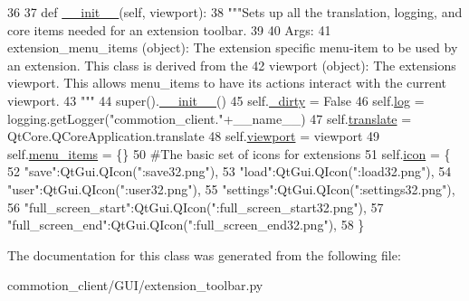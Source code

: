 \begin{DoxyCode}
36 
37     \textcolor{keyword}{def }\hyperlink{classcommotion__client_1_1GUI_1_1extension__toolbar_1_1ExtensionToolBar_a29e92f0e66f5f056be55e3a5ef7f2fd8}{\_\_init\_\_}(self, viewport):
38         \textcolor{stringliteral}{"""Sets up all the translation, logging, and core items needed for an extension toolbar.}
39 \textcolor{stringliteral}{        }
40 \textcolor{stringliteral}{        Args:}
41 \textcolor{stringliteral}{          extension\_menu\_items (object): The extension specific menu-item to be used by an extension. This
       class is derived from the  }
42 \textcolor{stringliteral}{          viewport (object): The extensions viewport. This allows menu\_items to have its actions interact
       with the current viewport.        }
43 \textcolor{stringliteral}{        """}
44         super().\hyperlink{classcommotion__client_1_1GUI_1_1extension__toolbar_1_1ExtensionToolBar_a29e92f0e66f5f056be55e3a5ef7f2fd8}{\_\_init\_\_}()
45         self.\hyperlink{classcommotion__client_1_1GUI_1_1extension__toolbar_1_1ExtensionToolBar_a84233fa2bbebfb96f4c6c490487b4f87}{\_dirty} = \textcolor{keyword}{False}
46         self.\hyperlink{classcommotion__client_1_1GUI_1_1extension__toolbar_1_1ExtensionToolBar_a6319ad6aa6c0480e17413b5c8a018d5f}{log} = logging.getLogger(\textcolor{stringliteral}{"commotion\_client."}+\_\_name\_\_)
47         self.\hyperlink{classcommotion__client_1_1GUI_1_1extension__toolbar_1_1ExtensionToolBar_ad52b111af7587b8ed8fb2e1703f8251b}{translate} = QtCore.QCoreApplication.translate
48         self.\hyperlink{classcommotion__client_1_1GUI_1_1extension__toolbar_1_1ExtensionToolBar_ae4fb6875e8968fb1b48a516117ee010f}{viewport} = viewport
49         self.\hyperlink{classcommotion__client_1_1GUI_1_1extension__toolbar_1_1ExtensionToolBar_a4c951281d81006ea5a1603030f4fa799}{menu\_items} = \{\}
50         \textcolor{comment}{#The basic set of icons for extensions}
51         self.\hyperlink{classcommotion__client_1_1GUI_1_1extension__toolbar_1_1ExtensionToolBar_afa628724b1895e1fe4f5bd5605ead016}{icon} = \{
52             \textcolor{stringliteral}{"save"}:QtGui.QIcon(\textcolor{stringliteral}{":save32.png"}),
53             \textcolor{stringliteral}{"load"}:QtGui.QIcon(\textcolor{stringliteral}{":load32.png"}),
54             \textcolor{stringliteral}{"user"}:QtGui.QIcon(\textcolor{stringliteral}{":user32.png"}),
55             \textcolor{stringliteral}{"settings"}:QtGui.QIcon(\textcolor{stringliteral}{":settings32.png"}),
56             \textcolor{stringliteral}{"full\_screen\_start"}:QtGui.QIcon(\textcolor{stringliteral}{":full\_screen\_start32.png"}),
57             \textcolor{stringliteral}{"full\_screen\_end"}:QtGui.QIcon(\textcolor{stringliteral}{":full\_screen\_end32.png"}),
58         \}

\end{DoxyCode}


The documentation for this class was generated from the following file\+:\begin{DoxyCompactItemize}
\item 
commotion\+\_\+client/\+G\+U\+I/extension\+\_\+toolbar.\+py\end{DoxyCompactItemize}
